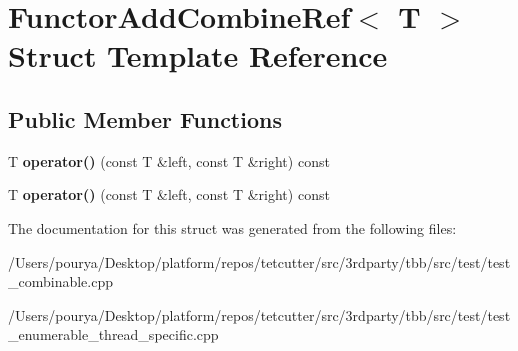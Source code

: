 \hypertarget{structFunctorAddCombineRef}{}\section{Functor\+Add\+Combine\+Ref$<$ T $>$ Struct Template Reference}
\label{structFunctorAddCombineRef}
\subsection*{Public Member Functions}
\begin{DoxyCompactItemize}
\item 
\hypertarget{structFunctorAddCombineRef_a46398ec244c52974de7efab39e5a3cff}{}T {\bfseries operator()} (const T \&left, const T \&right) const \label{structFunctorAddCombineRef_a46398ec244c52974de7efab39e5a3cff}

\item 
\hypertarget{structFunctorAddCombineRef_a46398ec244c52974de7efab39e5a3cff}{}T {\bfseries operator()} (const T \&left, const T \&right) const \label{structFunctorAddCombineRef_a46398ec244c52974de7efab39e5a3cff}

\end{DoxyCompactItemize}


The documentation for this struct was generated from the following files\+:\begin{DoxyCompactItemize}
\item 
/\+Users/pourya/\+Desktop/platform/repos/tetcutter/src/3rdparty/tbb/src/test/test\+\_\+combinable.\+cpp\item 
/\+Users/pourya/\+Desktop/platform/repos/tetcutter/src/3rdparty/tbb/src/test/test\+\_\+enumerable\+\_\+thread\+\_\+specific.\+cpp\end{DoxyCompactItemize}
